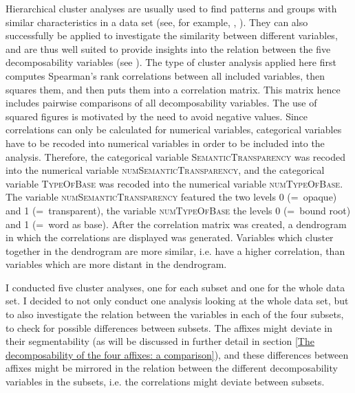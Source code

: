 Hierarchical cluster analyses are usually used to find patterns and groups with similar characteristics in a data  set (see, for example, \citealt[chapter 5.1.5]{Baayen.2008}, \citealt[chapter 8.1]{Zumel.2014}). They can also successfully be applied to investigate the similarity between different variables, and are thus well suited to provide insights into the relation between the five decomposability variables (see \citealt[200 f.]{Baayen.2008}). 
The type of cluster analysis applied here first computes Spearman's rank correlations between all included variables, then squares them, and then puts them into a correlation matrix. This matrix hence includes pairwise comparisons of all decomposability variables. The use of squared figures is motivated by the need to avoid negative values.
Since correlations can only be calculated for numerical variables,  categorical variables have to be recoded into numerical variables in order to be included into the analysis. 
Therefore, the categorical variable \textsc{SemanticTransparency}  was recoded into the numerical variable \textsc{numSemanticTransparency}, and the categorical variable \textsc{TypeOfBase} was recoded into the numerical variable \textsc{numTypeOfBase}.  The variable \textsc{numSemanticTransparency} featured  the two levels 0 (=~opaque) and 1 (=~transparent), the variable \textsc{numTypeOfBase} the levels 0 (=~bound root) and 1 (=~word as base). After the correlation matrix was created,  a dendrogram in which the correlations are displayed was generated. Variables which cluster together in the dendrogram are more similar, i.e. have a higher correlation, than variables which are more distant in the dendrogram. 

I conducted five cluster analyses, one for each subset and one for the whole data set. 
I decided to not only conduct one analysis looking at the whole data set, but to also investigate the relation between the variables in each of the four subsets, to check for possible differences between subsets. The affixes might deviate in their segmentability (as will be discussed in further detail in section \ref{The decomposability of the four affixes: a comparison}), and these differences between affixes might be mirrored in the relation between the different decomposability variables in the subsets, i.e. the correlations might deviate between subsets.

